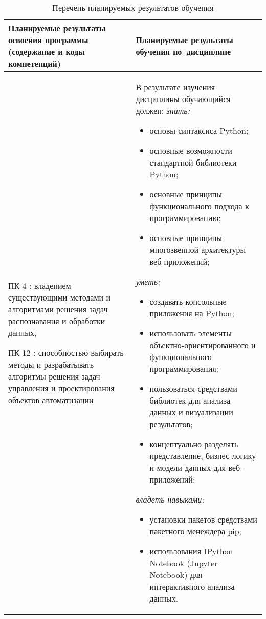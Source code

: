 \documentclass[a4paper,12pt]{article}
\begin{document}
  \begin{longtable}{|p{70mm}|p{84mm}|}
  \caption{Перечень планируемых результатов обучения}\\
  \hline
  \centering
  Планируемые результаты освоения программы (содержание и коды компетенций) & 
  \centering\arraybackslash
  Планируемые результаты обучения по~дисциплине
  \\
  \hline
  
  ПК-4 : владением существующими методами и алгоритмами решения задач распознавания и обработки данных, \par 
  
  ПК-12 : способностью выбирать методы и разрабатывать алгоритмы решения задач управления и проектирования объектов автоматизации
  & 
  В результате изучения дисциплины обучающийся должен:\newline
  \emph{знать:}
  \begin{itemize}
    \item основы синтаксиса Python; 
    \item основные возможности стандартной библиотеки Python; 
    \item основные принципы функционального подхода к программированию; 
    \item основные принципы многозвенной архитектуры веб-приложений; 
  \end{itemize}
  

  \emph{уметь:}
  \begin{itemize}
    \item создавать консольные приложения на Python; 
    \item использовать элементы объектно-ориентированного и функционального программирования; 
    \item пользоваться средствами библиотек для анализа данных и визуализации результатов; 
    \item концептуально разделять представление, бизнес-логику и модели данных для веб-приложений; 
  \end{itemize}
  

  \emph{владеть навыками:}
  \begin{itemize}
    \item установки пакетов средствами пакетного менеждера pip; 
    \item использования IPython Notebook (Jupyter Notebook) для интерактивного анализа данных. 
  \end{itemize}
  
  \\
  \hline
  \end{longtable}
\end{document}
